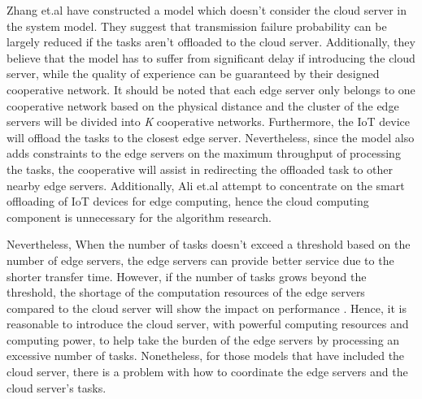 \documentclass[a4paper,11pt]{article}
\begin{document}
Zhang et.al \cite{no_cloud_1_density} have constructed a model which doesn't consider the cloud server in the system model. They suggest that transmission failure probability can be largely reduced if the tasks aren't offloaded to the cloud server. Additionally, they believe that the model has to suffer from significant delay if introducing the cloud server, while the quality of experience can be guaranteed by their designed cooperative network. It should be noted that each edge server only belongs to one cooperative network based on the physical distance and the cluster of the edge servers will be divided into \textit{K} cooperative networks. Furthermore, the IoT device will offload the tasks to the closest edge server. Nevertheless, since the model also adds constraints to the edge servers on the maximum throughput of processing the tasks, the cooperative will assist in redirecting the offloaded task to other nearby edge servers. Additionally, Ali et.al \cite{granuity_2} attempt to concentrate on the smart offloading of IoT devices for edge computing, hence the cloud computing component is unnecessary for the algorithm research.\newline %

Nevertheless, When the number of tasks doesn't exceed a threshold based on the number of edge servers, the edge servers can provide better service due to the shorter transfer time. However, if the number of tasks grows beyond the threshold, the shortage of the computation resources of the edge servers compared to the cloud server will show the impact on performance \cite{A_Cooperative_Partial_Computation_Offloading_Scheme_for_Mobile_Edge}. Hence, it is reasonable to introduce the cloud server, with powerful computing resources and computing power, to help take the burden of the edge servers by processing an excessive number of tasks. Nonetheless, for those models that have included the cloud server, there is a problem with how to coordinate the edge servers and the cloud server's tasks. \newline
\end{document}
